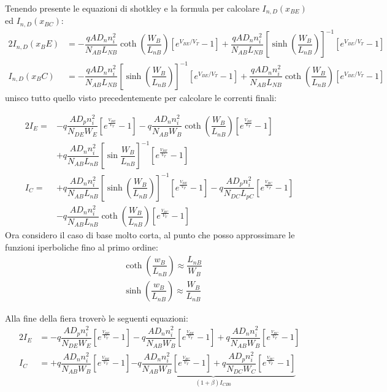 \begin{exbox}
\begin{equation*}
    \end{equation*}
    Tenendo presente le equazioni di shotkley e la formula per calcolare $I_{n,D}(x_{BE})$ ed $I_{n,D}(x_{BC})$:
    \begin{alignat*}{2}
        I_{n,D}(x_BE)&=-\dfrac{qAD_n n_i^2}{N_{AB}L_{NB}}\coth{\left( \dfrac{W_B}{L_{nB}}\right)}\left[ e^{V_{BE}/V_T}-1\right]+\dfrac{qAD_n n_i^2}{N_{AB}L_{NB}}\left[\sinh{\left( \dfrac{W_B}{L_{nB}}\right)}\right]^{-1}\left[ e^{V_{BE}/V_T}-1\right] \\
        I_{n,D}(x_BC)&=-\dfrac{qAD_n n_i^2}{N_{AB}L_{NB}}\left[\sinh{\left( \dfrac{W_B}{L_{nB}}\right)}\right]^{-1}\left[ e^{V_{BE}/V_T}-1\right]+\dfrac{qAD_n n_i^2}{N_{AB}L_{NB}}\coth{\left( \dfrac{W_B}{L_{nB}}\right)}\left[ e^{V_{BE}/V_T}-1\right]
    \end{alignat*}
    unisco tutto quello visto precedentemente per calcolare le correnti finali:
    
    \begin{alignat*}{2}
        I_E = &-q \dfrac{AD_p n_i^2}{N_{DE} W_E} \left[ e^{\frac{V_{BE}}{V_T}}-1\right] -q\dfrac{AD_n n_i^2}{N_{AB} W_B}\coth{\left(\dfrac{W_B}{L_{nB}}\right)} \left[ e^{\frac{V_{BE}}{V_T}}-1\right]\\ &+q \dfrac{AD_n n_i^2}{N_{AB} L_{nB}} \left[\sin{\dfrac{W_B}{L_{nB}}}\right]^{-1}\left[ e^{\frac{V_{BE}}{V_T}}-1\right]
        \\
        I_C = &+q \dfrac{AD_n n_i^2}{N_{AB} L_{nB}}\left[\sinh{\left( \dfrac{W_B}{L_{nB}}\right)}\right]^{-1} \left[ e^{\frac{V_{BE}}{V_T}}-1\right] -q\dfrac{AD_p n_i^2}{N_{DC} L_{pC}} \left[ e^{\frac{V_{BC}}{V_T}}-1\right]\\ & -q \dfrac{A D_n n_i^2}{N_{AB} L_{nB}}\coth{\left(\dfrac{W_B}{L_{nB}}\right)} \left[ e^{\frac{V_{BC}}{V_T}}-1\right]
    \end{alignat*}
    Ora considero il caso di base molto corta, al punto che posso approssimare le funzioni iperboliche fino al primo ordine:
    \begin{align*}
        &\coth\left(\dfrac{w_B}{L_{nB}}\right) \approx \dfrac{L_{nB}}{W_B} \\
        &\sinh\left(\dfrac{w_B}{L_{nB}}\right) \approx \dfrac{W_B}{L_{nB}}
    \end{align*}
\end{exbox}
%
\cleardoublepage
Alla fine della fiera troverò le seguenti equazioni:
%
\begin{alignat}{2}
    I_E &= -q \dfrac{AD_p n_i^2}{N_{DE} W_E} \left[ e^{\frac{V_{BE}}{V_T}}-1\right] -q\dfrac{AD_n n_i^2}{N_{AB} W_B} \left[ e^{\frac{V_{BE}}{V_T}}-1\right]  +q \dfrac{AD_n n_i^2}{N_{AB} W_B} \left[ e^{\frac{V_{BC}}{V_T}}-1\right] \label{eq:Ebers-Mole}
    \\
    I_C &= +q \dfrac{AD_n n_i^2}{N_{AB} W_B} \left[ e^{\frac{V_{BE}}{V_T}}-1\right]  \underbrace{-q\dfrac{AD_n n_i^2}{N_{AB} W_B} \left[ e^{\frac{V_{BC}}{V_T}}-1\right]  +q \dfrac{AD_p n_i^2}{N_{DC} W_C} \left[ e^{\frac{V_{BC}}{V_T}}-1\right] }_{(1+\beta)I_{CB0}}
\end{alignat}
